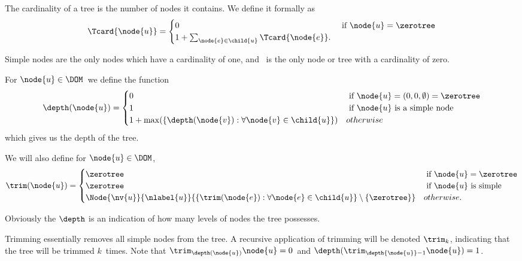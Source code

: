 \begin{definition}
  The cardinality of a tree is the number of nodes it contains. We
  define it formally as
  \begin{align*}
  \Tcard{\node{u}} = \begin{cases}
    0 & \text{ if } \node{u} = \zerotree\\
    1 + \sum_{\node{e}\in\child{u}} \Tcard{\node{e}}.
    \end{cases}
  \end{align*}

Simple nodes are the only nodes which have a cardinality of one, and \tzerotree\ is the only node or tree with a
cardinality of zero.
\end{definition}

\begin{definition}
  For \(\node{u} \in \DOM\)\ we define the function
  \begin{align*}
    \depth(\node{u}) = \begin{cases}
      0 & \text{ if } \node{u} = (0,0,\emptyset) = \zerotree \\
      1 & \text{ if } \node{u} \text{ is a simple node} \\
      1 + \max(\lbrace\depth(\node{v}):\forall \node{v} \in \child{u}\rbrace) & otherwise
    \end{cases}
  \end{align*}
  which gives us the depth of the tree.
\end{definition}

\begin{definition}
  We will also define for \(\node{u} \in \DOM\),
  \begin{align*}
      \trim(\node{u}) = \begin{cases}
        \zerotree & \text{ if } \node{u} = \zerotree \\
        \zerotree & \text{ if } \node{u} \text{ is simple} \\
        \Node{\nv{u}}{\nlabel{u}}{\lbrace \trim(\node{e}): \forall\node{e}\in\child{u} \rbrace \setminus \{\zerotree\}} & otherwise.
      \end{cases}
  \end{align*}
\end{definition}

Obviously the $\depth$ is an indication of how many levels of nodes
the tree possesses.

Trimming essentially removes all simple nodes from the tree.
 A recursive application
of trimming will be denoted \(\trim_{k}\), indicating that the tree
 will be trimmed \(k\)\ times. Note that
\(\trim_{\depth(\node{u})}{\node{u}} = 0\)\ and
\(\depth(\trim_{\depth{\node{u}}-1}{\node{u}}) = 1\).

